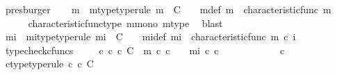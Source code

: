 \begin{isabellebody}
\ presburger\isanewline
\ \ \isamarkupfalse%
\ {\isasymchi}m\ \ {\isasymchi}m{\isacharunderscore}{\kern0pt}type{\isacharbrackleft}{\kern0pt}type{\isacharunderscore}{\kern0pt}rule{\isacharbrackright}{\kern0pt}{\isacharcolon}{\kern0pt}\ {\isachardoublequoteopen}{\isasymchi}m\ {\isacharcolon}{\kern0pt}\ C\ {\isasymrightarrow}\ {\isasymOmega}{\isachardoublequoteclose}\ \ {\isasymchi}m{\isacharunderscore}{\kern0pt}def{\isacharcolon}{\kern0pt}\ {\isachardoublequoteopen}{\isasymchi}m\ {\isacharequal}{\kern0pt}\ characteristic{\isacharunderscore}{\kern0pt}func\ m{\isachardoublequoteclose}\isanewline
\ \ \ \ \isamarkupfalse%
\ characteristic{\isacharunderscore}{\kern0pt}func{\isacharunderscore}{\kern0pt}type\ m{\isacharunderscore}{\kern0pt}mono\ m{\isacharunderscore}{\kern0pt}type\ \isamarkupfalse%
\ blast\isanewline
\ \ \isamarkupfalse%
\ {\isasymchi}mi\ \ {\isasymchi}mi{\isacharunderscore}{\kern0pt}type{\isacharbrackleft}{\kern0pt}type{\isacharunderscore}{\kern0pt}rule{\isacharbrackright}{\kern0pt}{\isacharcolon}{\kern0pt}\ {\isachardoublequoteopen}{\isasymchi}mi\ {\isacharcolon}{\kern0pt}\ C\ {\isasymrightarrow}\ {\isasymOmega}{\isachardoublequoteclose}\ \ {\isasymchi}mi{\isacharunderscore}{\kern0pt}def{\isacharcolon}{\kern0pt}\ {\isachardoublequoteopen}{\isasymchi}mi\ {\isacharequal}{\kern0pt}\ characteristic{\isacharunderscore}{\kern0pt}func\ {\isacharparenleft}{\kern0pt}m\ {\isasymcirc}\isactrlsub c\ i{\isacharparenright}{\kern0pt}{\isachardoublequoteclose}\isanewline
\ \ \ \ \isamarkupfalse%
\ {\isacharparenleft}{\kern0pt}typecheck{\isacharunderscore}{\kern0pt}cfuncs{\isacharparenright}{\kern0pt}\isanewline
\ \ \isamarkupfalse%
\ {\isachardoublequoteopen}{\isasymAnd}\ c{\isachardot}{\kern0pt}\ c\ {\isasymin}\isactrlsub c\ C\ {\isasymLongrightarrow}\ {\isacharparenleft}{\kern0pt}{\isasymchi}m\ {\isasymcirc}\isactrlsub c\ c\ {\isacharequal}{\kern0pt}\ {\isasymt}{\isacharparenright}{\kern0pt}\ {\isacharequal}{\kern0pt}\ {\isacharparenleft}{\kern0pt}{\isasymchi}mi\ {\isasymcirc}\isactrlsub c\ c\ {\isacharequal}{\kern0pt}\ {\isasymt}{\isacharparenright}{\kern0pt}{\isachardoublequoteclose}\isanewline
\ \ \isamarkupfalse%
\ {\isacharminus}{\kern0pt}\isanewline
\ \ \ \ \isamarkupfalse%
\ c\isanewline
\ \ \ \ \isamarkupfalse%
\ c{\isacharunderscore}{\kern0pt}type{\isacharbrackleft}{\kern0pt}type{\isacharunderscore}{\kern0pt}rule{\isacharbrackright}{\kern0pt}{\isacharcolon}{\kern0pt}\ {\isachardoublequoteopen}c\ {\isasymin}\isactrlsub c\ C{\isachardoublequoteclose}\isanewline

\end{isabellebody}
